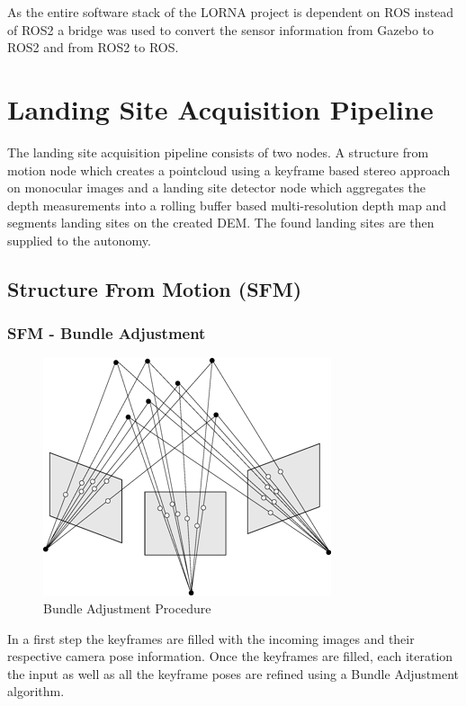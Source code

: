 As the entire software stack of the LORNA project is dependent on ROS instead of ROS2 a bridge was used to convert the sensor information from Gazebo to ROS2 and from ROS2 to ROS.


\section{Landing Site Acquisition Pipeline}\label{sec:setup:LSD}

The landing site acquisition pipeline consists of two nodes. A structure from motion node \citep{SFM} which creates a pointcloud using a keyframe based stereo approach on monocular images and a landing site detector node \citep{LSD1, LSD2} which aggregates the depth measurements into a rolling buffer based multi-resolution depth map and segments landing sites on the created DEM. The found landing sites are then supplied to the autonomy. 

\subsection{Structure From Motion (SFM)}\label{subsec:setup:SFM}

\subsubsection{SFM - Bundle Adjustment}

\begin{figure}[ht!]
    \centering
    \includegraphics[scale=0.5]{images/setup/BA.png}
    \caption{Bundle Adjustment Procedure}
\end{figure}

In a first step the keyframes are filled with the incoming images and their respective camera pose information. Once the keyframes are filled, each iteration the input as well as all the keyframe poses are refined using a Bundle Adjustment algorithm. 

